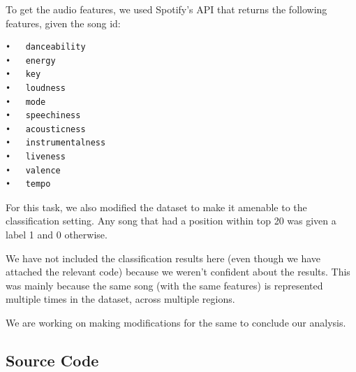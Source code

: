 \documentclass[]{article}
\begin{document}
To get the audio features, we used Spotify's API that returns the
following features, given the song id:

\begin{verbatim}
•   danceability
•   energy
•   key
•   loudness
•   mode
•   speechiness
•   acousticness
•   instrumentalness
•   liveness
•   valence
•   tempo
\end{verbatim}

For this task, we also modified the dataset to make it amenable to the
classification setting. Any song that had a position within top 20 was
given a label 1 and 0 otherwise.

We have not included the classification results here (even though we
have attached the relevant code) because we weren't confident about the
results. This was mainly because the same song (with the same features)
is represented multiple times in the dataset, across multiple regions.

We are working on making modifications for the same to conclude our
analysis.

\newpage

\subsection{Source Code}\label{source-code}
\end{document}
